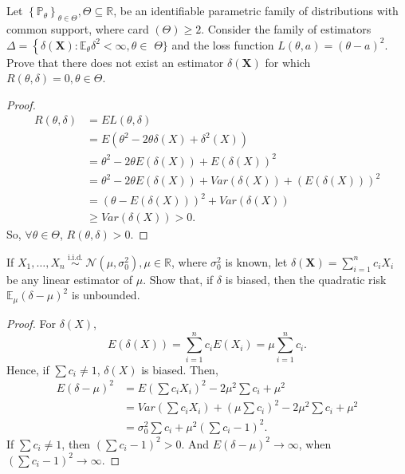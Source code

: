 \chapter{}

\begin{ex}
    Let \(\left\{\mathbb{P}_{\theta}\right\}_{\theta \in \Theta}, \Theta \subseteq \mathbb{R}\), be an identifiable parametric family of distributions with common support, where card \((\Theta) \geq 2\). Consider the family of estimators \(\Delta=\left\{\delta(\mathbf{X}): \mathbb{E}_{\theta} \delta^{2}<\infty, \theta \in\right.\) \(\Theta\}\) and the loss function \(L(\theta, a)=(\theta-a)^{2}\). Prove that there does not exist an estimator \(\delta(\mathbf{X})\) for which \(R(\theta, \delta)=0, \theta \in \Theta\).
\end{ex}

\begin{proof}
    \[\begin{aligned}
            R(\theta, \delta)&=EL(\theta, \delta)\\
            &=E(\theta^2-2\theta\delta(X)+\delta^2(X))\\
            &=\theta^2-2\theta E(\delta(X))+E(\delta(X))^2\\
            &=\theta^2-2\theta E(\delta(X))+Var(\delta(X))+(E(\delta(X)))^2\\
            &=(\theta-E(\delta(X)))^2+Var(\delta(X))\\
            &\geqslant Var(\delta(X))>0. 
        \end{aligned}
    \]
    So, $\forall \theta \in \Theta$, $R(\theta, \delta)>0$. 
\end{proof}

\begin{ex}
    If \(X_{1}, \ldots, X_{n} \stackrel{\text { i.i.d. }}{\sim} \mathcal{N}\left(\mu, \sigma_{0}^{2}\right), \mu \in \mathbb{R}\), where \(\sigma_{0}^{2}\) is known, let \(\delta(\mathbf{X})=\sum_{i=1}^{n} c_{i} X_{i}\) be any linear estimator of \(\mu\). Show that, if \(\delta\) is biased, then the quadratic risk \(\mathbb{E}_{\mu}(\delta-\mu)^{2}\) is unbounded. 
\end{ex}

\begin{proof}
    For $\delta(X)$, 
    \[
        E(\delta(X))=\sum_{i=1}^nc_i E(X_i)=\mu\sum_{i=1}^nc_i. 
    \]
    Hence, if $\sum c_i\neq 1$, $\delta(X)$ is biased. Then, 
    \[
        \begin{aligned}
            E(\delta-\mu)^2&=E\left(\sum c_iX_i\right)^2-2\mu^2\sum c_i+\mu^2\\
            &=Var\left(\sum c_iX_i\right)+\left(\mu\sum c_i\right)^2-2\mu^2\sum c_i+\mu^2\\
            &=\sigma_0^2\sum c_i+\mu^2\left(\sum c_i-1\right)^2. 
        \end{aligned}
    \] 
    If $\sum c_i\neq 1$, then $\left(\sum c_i-1\right)^2>0$. And $E(\delta-\mu)^2\to\infty$, when $\left(\sum c_i-1\right)^2\to \infty$. 
\end{proof}

